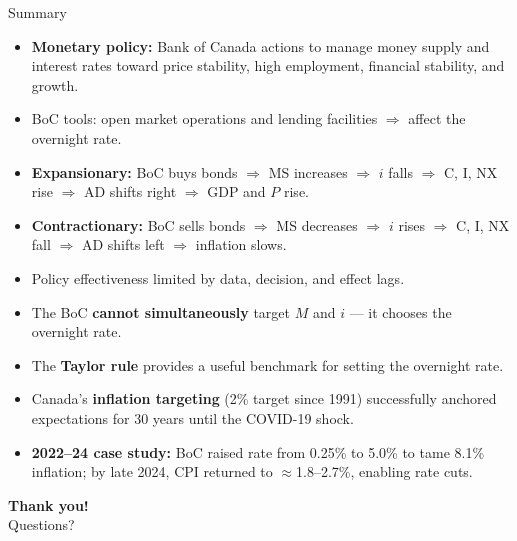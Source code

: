 \documentclass[aspectratio=169]{beamer}
\begin{document}
\begin{frame}{Summary}
\transfade
\begin{itemize}[<+->]
  \item \textbf{Monetary policy:} Bank of Canada actions to manage money supply and interest rates toward price stability, high employment, financial stability, and growth.
  \item BoC tools: open market operations and lending facilities $\Rightarrow$ affect the overnight rate.
  \item \textbf{Expansionary:} BoC buys bonds $\Rightarrow$ MS increases $\Rightarrow$ $i$ falls $\Rightarrow$ C, I, NX rise $\Rightarrow$ AD shifts right $\Rightarrow$ GDP and $P$ rise.
  \item \textbf{Contractionary:} BoC sells bonds $\Rightarrow$ MS decreases $\Rightarrow$ $i$ rises $\Rightarrow$ C, I, NX fall $\Rightarrow$ AD shifts left $\Rightarrow$ inflation slows.
  \item Policy effectiveness limited by data, decision, and effect lags.
  \item The BoC \textbf{cannot simultaneously} target $M$ and $i$ --- it chooses the overnight rate.
  \item The \textbf{Taylor rule} provides a useful benchmark for setting the overnight rate.
  \item Canada's \textbf{inflation targeting} (2\% target since 1991) successfully anchored expectations for 30 years until the COVID-19 shock.
  \item \textbf{2022--24 case study:} BoC raised rate from 0.25\% to 5.0\% to tame 8.1\% inflation; by late 2024, CPI returned to $\approx$1.8--2.7\%, enabling rate cuts.
\end{itemize}
\end{frame}

\begin{frame}
\centering
\Huge \textbf{Thank you!}\\[1em]
\large Questions?
\end{frame}
\end{document}
